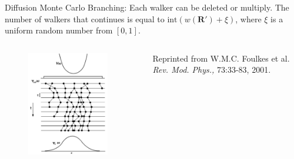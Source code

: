 \documentclass{beamer}
\newcommand{\R}{\mathbf{R}}
\begin{document}
\begin{frame}{Diffusion Monte Carlo}
Branching: Each walker can be deleted or multiply. The number of walkers that continues is equal to $\mathrm{int}\left(w(\R')+\xi\right)$, where $\xi$ is a uniform random number from $[0,1]$.
\begin{columns}
\begin{column}{0.4\textwidth}
\begin{figure}
   \includegraphics[width=0.9\textwidth]{figures/branch_full.png}
\end{figure}
\end{column}
\begin{column}{0.7\textwidth}
   {\color{blue}{Figure:}} Reprinted from W.M.C. Foulkes et al. \textit{Rev. Mod. Phys.,} 73:33-83, 2001.
\end{column}
\end{columns}
\end{frame}
\end{document}

